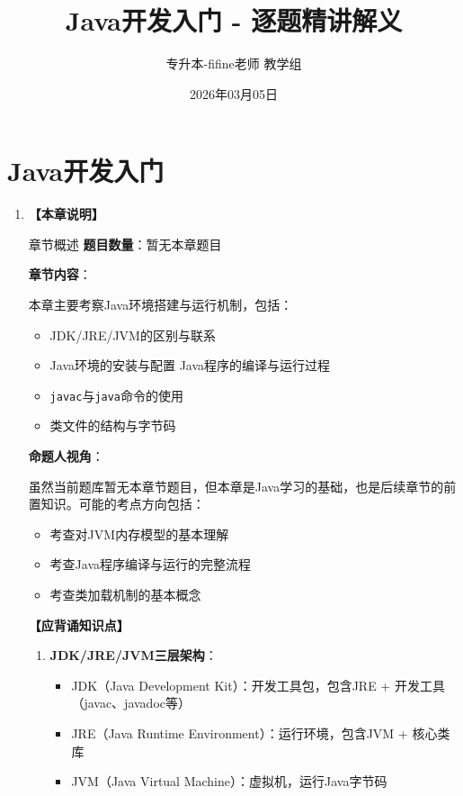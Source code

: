 \documentclass[12pt, a4paper]{ctexart}
\title{\textcolor{myblue}{\textbf{Java开发入门 - 逐题精讲解义}}}
\author{专升本-fifine老师 教学组}
\date{2026年03月05日}
\begin{document}
\maketitle
\thispagestyle{empty}
\newpage

\section{Java开发入门}

\begin{enumerate}[label=\textbf{\arabic*.}]

	\item \textbf{【本章说明】}

	      \begin{bluebox}{章节概述}
		      \textbf{题目数量}：暂无本章题目

		      \textbf{章节内容}：

		      本章主要考察Java环境搭建与运行机制，包括：
		      \begin{itemize}[label={}, leftmargin=*, nosep]
			      \item JDK/JRE/JVM的区别与联系
			      \item Java环境的安装与配置
			            \textbackslashitem Java程序的编译与运行过程
			      \item \texttt{javac}与\texttt{java}命令的使用
			      \item 类文件的结构与字节码
		      \end{itemize}

		      \textbf{命题人视角}：

		      虽然当前题库暂无本章节题目，但本章是Java学习的基础，也是后续章节的前置知识。可能的考点方向包括：
		      \begin{itemize}[label={}, leftmargin=*, nosep]
			      \item 考查对JVM内存模型的基本理解
			      \item 考查Java程序编译与运行的完整流程
			      \item 考查类加载机制的基本概念
		      \end{itemize}

		      \textbf{【应背诵知识点】}

		      \begin{enumerate}[label={}, leftmargin=*, nosep]
			      \item \textbf{JDK/JRE/JVM三层架构}：
			            \begin{itemize}
				            \item JDK（Java Development Kit）：开发工具包，包含JRE + 开发工具（javac、javadoc等）
				            \item JRE（Java Runtime Environment）：运行环境，包含JVM + 核心类库
				            \item JVM（Java Virtual Machine）：虚拟机，运行Java字节码
			            \end{itemize}


\end{enumerate}
\end{bluebox}
\end{enumerate}
\end{document}
